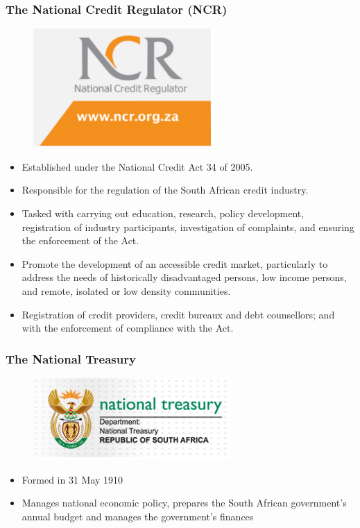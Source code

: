 \documentclass[11pt]{beamer}
\begin{document}
\begin{frame}
\frametitle{ The National Credit Regulator (NCR)}
\begin{figure}
\includegraphics[width=0.2 \textwidth]{NCR.png}
\end{figure}
\begin{itemize}
\item Established under the National Credit Act 34 of 2005.
\item Responsible for the regulation of the South African credit industry.
\item Tasked with carrying out education, research, policy development, registration of industry participants, investigation of complaints, and ensuring the enforcement of the Act.
\item Promote the development of an accessible credit market, particularly to address the needs of historically disadvantaged persons, low income persons, and remote, isolated or low density communities.
\item Registration of credit providers, credit bureaux and debt counsellors; and with the enforcement of compliance with the Act.
\end{itemize}

\end{frame}

\begin{frame}
\frametitle{The National Treasury}
\begin{figure}
\includegraphics[width=0.2 \textwidth]{NT.png}
\end{figure}
\begin{itemize}
\item Formed in 31 May 1910
\item Manages national economic policy, prepares the South African government's annual budget and manages the government's finances
\end{itemize}
\end{frame}


\end{document}
